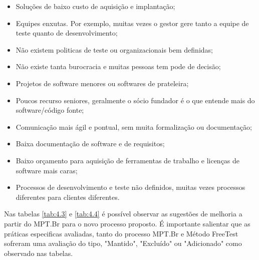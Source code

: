 \begin{itemize}
    \item Soluções de baixo custo de aquisição e implantação;
    \item Equipes enxutas. Por exemplo, muitas vezes o gestor gere tanto a equipe de teste quanto de desenvolvimento;
    \item Não existem politicas de teste ou organizacionais bem definidas;
    \item Não existe tanta burocracia e muitas pessoas tem pode de decisão;
    \item Projetos de software menores ou softwares de prateleira;
    \item Poucos recurso seniores, geralmente o sócio fundador é o que entende mais do software/código fonte;
    \item Comunicação mais ágil e pontual, sem muita formalização ou documentação;
    \item Baixa documentação de software e de requisitos;
    \item Baixo orçamento para aquisição de ferramentas de trabalho e licenças de software mais caras;
    \item Processos de desenvolvimento e teste não definidos, muitas vezes processos diferentes para clientes diferentes.
\end{itemize}

Nas tabelas \ref{tab:4.3} e \ref{tab:4.4} é possível observar as sugestões de melhoria a partir do MPT.Br para o novo processo proposto. É importante salientar que as práticas especificas avaliadas, tanto do processo MPT.Br e Método FreeTest sofreram uma avaliação do tipo, "Mantido", "Excluído" ou "Adicionado" como observado nas tabelas. 

